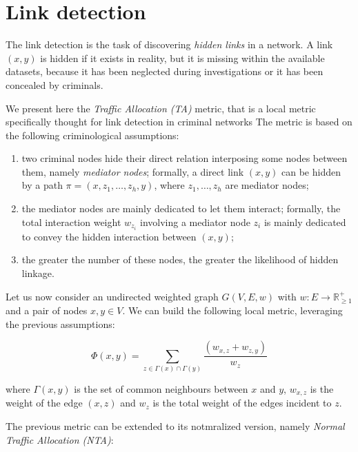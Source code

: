\section{Link detection}
\label{sec:link-detection}

The link detection is the task of discovering \textit{hidden links} in a network. 
A link $(x,y)$ is hidden if it exists in reality, but it is missing within the available datasets, because it has been neglected during investigations or it has been concealed by criminals.

We present here the \textit{Traffic Allocation (TA)} metric, that is a local metric specifically thought for link detection in criminal networks 
The metric is based on the following criminological assumptions: 

\begin{enumerate}
	\item two criminal nodes hide their direct relation interposing some nodes between them, namely \textit{mediator nodes}; formally, a direct link $(x,y)$ can be hidden by a path $\pi=(x,z_{1},\ldots,z_{h},y)$, where $z_{1},\ldots,z_{h}$ are mediator nodes;
	
	\item the mediator nodes are mainly dedicated to let them interact; formally, the total interaction weight $w_{z_{i}}$ involving a mediator node $z_{i}$ is mainly dedicated to convey the hidden interaction between $(x,y)$;
	
	\item the greater the number of these nodes, the greater the likelihood of hidden linkage. 
\end{enumerate}

Let us now consider an undirected weighted graph $G(V,E,w)$ with $w:E\rightarrow\mathbb{R}_{\geq1}^{+}$ and a pair of nodes $x,y\in V$.
We can build the following local metric, leveraging the previous assumptions:

\begin{equation}
\label{eqn:ta-local}
\Phi(x,y)=
\sum\limits_{z\in\Gamma(x)\cap\Gamma(y)}
\frac{(w_{x,z}+w_{z,y})}{w_{z}}
\end{equation}

where 
$\Gamma(x,y)$ is the set of common neighbours between $x$ and $y$,
$w_{x,z}$ is the weight of the edge $(x,z)$ and
$w_{z}$ is the total weight of the edges incident to $z$.

The previous metric can be extended to its notmralized version, namely \textit{Normal Traffic Allocation (NTA)}:

